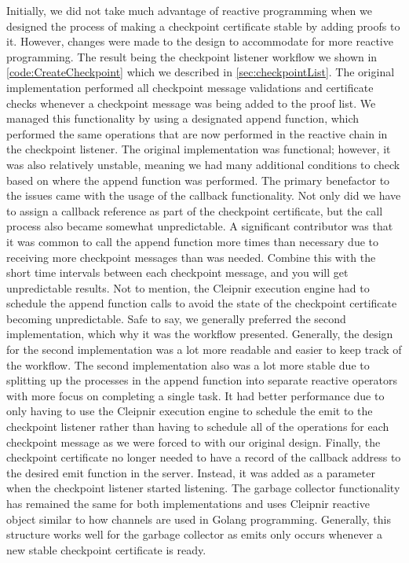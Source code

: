 Initially, we did not take much advantage of reactive programming when we designed the process of making a checkpoint certificate stable by adding proofs to it. However, changes were made to the design to accommodate for more reactive programming. The result being the checkpoint listener workflow we shown in \autoref{code:CreateCheckpoint} which we described in \autoref{sec:checkpointList}. The original implementation performed all checkpoint message validations and certificate checks whenever a checkpoint message was being added to the proof list. We managed this functionality by using a designated append function, which performed the same operations that are now performed in the reactive chain in the checkpoint listener. The original implementation was functional; however, it was also relatively unstable, meaning we had many additional conditions to check based on where the append function was performed. The primary benefactor to the issues came with the usage of the callback functionality. Not only did we have to assign a callback reference as part of the checkpoint certificate, but the call process also became somewhat unpredictable. A significant contributor was that it was common to call the append function more times than necessary due to receiving more checkpoint messages than was needed. Combine this with the short time intervals between each checkpoint message, and you will get unpredictable results. Not to mention, the Cleipnir execution engine had to schedule the append function calls to avoid the state of the checkpoint certificate becoming unpredictable. Safe to say, we generally preferred the second implementation, which why it was the workflow presented. Generally, the design for the second implementation was a lot more readable and easier to keep track of the workflow. The second implementation also was a lot more stable due to splitting up the processes in the append function into separate reactive operators with more focus on completing a single task. It had better performance due to only having to use the Cleipnir execution engine to schedule the emit to the checkpoint listener rather than having to schedule all of the operations for each checkpoint message as we were forced to with our original design. Finally, the checkpoint certificate no longer needed to have a record of the callback address to the desired emit function in the server. Instead, it was added as a parameter when the checkpoint listener started listening.
The garbage collector functionality has remained the same for both implementations and uses Cleipnir reactive  object similar to how channels are used in Golang programming. Generally, this structure works well for the garbage collector as emits only occurs whenever a  new stable checkpoint certificate is ready.
\fi

